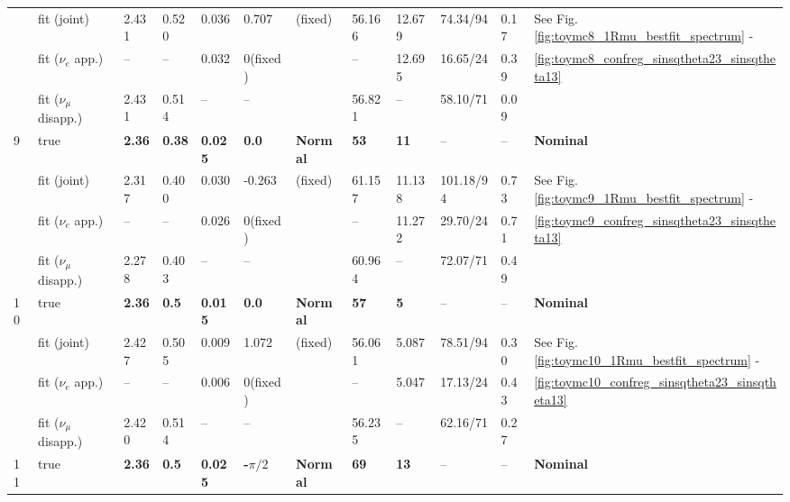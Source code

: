 \begin{table}
\begin{tabular}{@{}|p{0.1cm}p{2.5cm}|p{1.5cm}p{1cm}p{1cm}p{1cm}|p{1cm}|p{1.0cm}p{1.0cm}|p{1.2cm}p{1.2cm}|p{1.5cm}|@{}}
   & fit (joint)               &    2.431       &  0.520     &     0.036  &   0.707 & (fixed)    &    56.166  &  12.679     & 74.34/94        & 0.17  & See Fig. \ref{fig:toymc8_1Rmu_bestfit_spectrum} -  \\
   & fit ($\nu_{e}$ app.)      & --                             & --         &   0.032    & 0(fixed)  &     & --         &  12.695     & 16.65/24      & 0.39 &   \ref{fig:toymc8_confreg_sinsqtheta23_sinsqtheta13}\\
   & fit ($\nu_{\mu}$ disapp.) &     2.431     &    0.514   & --         & --       &    &  56.821     & --          & 58.10/71    & 0.09 &   \\
\hline
9  & true                      & {\bf 2.36 }   & {\bf 0.38}   & {\bf 0.025}   & {\bf 0.0}  & {\bf Normal} & {\bf 53}   & {\bf 11}    & --          & --   & {\bf Nominal} \\
   & fit (joint)               &     2.317      &    0.400   &    0.030   &   -0.263 & (fixed)    &    61.157  &     11.138  & 101.18/94        & 0.73  & See Fig. \ref{fig:toymc9_1Rmu_bestfit_spectrum} -  \\
   & fit ($\nu_{e}$ app.)      & --                             & --         &    0.026   & 0(fixed)  &     & --         &   11.272    & 29.70/24      & 0.71 &   \ref{fig:toymc9_confreg_sinsqtheta23_sinsqtheta13}\\
   & fit ($\nu_{\mu}$ disapp.) &   2.278       &     0.403  & --         & --       &    & 60.964       & --          & 72.07/71    & 0.49 &   \\
   \hline
10  & true                      & {\bf 2.36 }   & {\bf 0.5}   & {\bf 0.015}   & {\bf 0.0}  & {\bf Normal} & {\bf 57}   & {\bf 5}    & --          & --   & {\bf Nominal} \\
   & fit (joint)               &     2.427      &    0.505   &    0.009   &   1.072 & (fixed)    &    56.061  &     5.087  & 78.51/94        & 0.30  & See Fig. \ref{fig:toymc10_1Rmu_bestfit_spectrum} -  \\
   & fit ($\nu_{e}$ app.)      & --                             & --         &    0.006   & 0(fixed)  &     & --         &   5.047    & 17.13/24      & 0.43 &   \ref{fig:toymc10_confreg_sinsqtheta23_sinsqtheta13}\\
   & fit ($\nu_{\mu}$ disapp.) &   2.420       &     0.514  & --         & --       &    & 56.235       & --          & 62.16/71    & 0.27 &   \\
   \hline
11  & true                      & {\bf 2.36 }   & {\bf 0.5}   & {\bf 0.025}   & {\bf -$\pi/2$}  & {\bf Normal} & {\bf 69}   & {\bf 13}    & --          & --   & {\bf Nominal} \\

\end{tabular}
\end{table}
